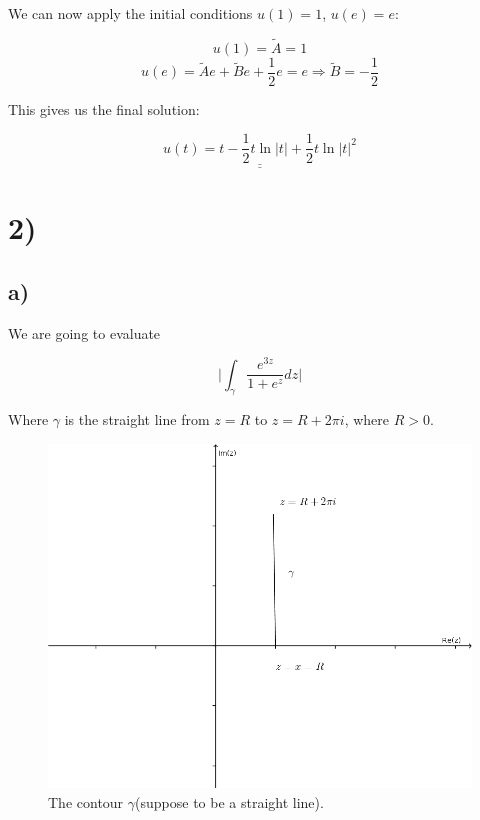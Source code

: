 \documentclass[a4paper,norsk, 10pt]{article}
\begin{document}
We can now apply the initial conditions $u(1) = 1$, $u(e) = e$:

$$
u(1) = \tilde{A} = 1 
$$
$$
u(e) = \tilde{A}e + \tilde{B}e + \frac{1}{2}e = e \Rightarrow \tilde{B} = -\frac{1}{2}
$$

This gives us the final solution:

\begin{equation}
\underline{\underline{u(t) = t -\frac{1}{2}t\ln |t| + \frac{1}{2}t\ln |t|^2}}
\end{equation}
\newpage

\section*{2)}

\subsection*{a)}

We are going to evaluate 

$$
\bigg| \int_{\gamma} \frac{e^{3z}}{1+e^z} dz \bigg| 
$$

Where $\gamma$ is the straight line from $z = R$ to $z = R + 2\pi i$, where $R > 0$.\\

\begin{figure}[H]
\centering
\includegraphics[scale=0.4]{2a.png}
\caption{The contour $\gamma$(suppose to be a straight line).}
\end{figure}
\end{document}
